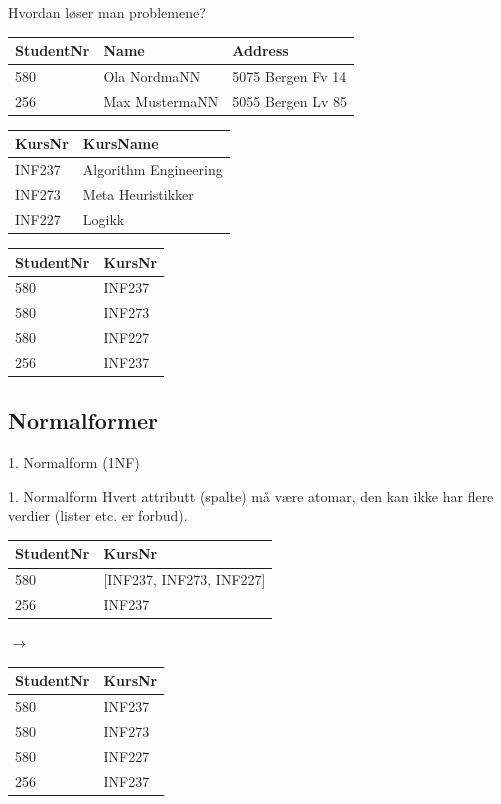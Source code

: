 \begin{frame}{Hvordan løser man problemene?}
\begin{tabular}{l|l|l}
 StudentNr & Name & Address\\\hline
 580 & Ola NordmaNN & 5075 Bergen Fv 14\\
 256 & Max MustermaNN & 5055 Bergen Lv 85\\
\end{tabular}
\vfill
\begin{tabular}{l|l}
KursNr & KursName \\\hline
INF237 & Algorithm Engineering\\
INF273 & Meta Heuristikker\\
INF227 & Logikk\\
\end{tabular}
\hfill
\begin{tabular}{l|l}
 StudentNr & KursNr\\\hline
 580 & INF237\\
 580 & INF273\\
 580 & INF227\\
 256 & INF237\\
\end{tabular}
\end{frame}

\subsection*{Normalformer}
\begin{frame}{1. Normalform (1NF)}
    \begin{block}{1. Normalform}
    Hvert attributt (spalte) må være atomar, den kan ikke har flere verdier (lister etc. er forbud).
    \end{block}
    \vfill
    \begin{tabular}{l|l}
     StudentNr & KursNr\\\hline
     580 & [INF237, INF273, INF227]\\
     256 & INF237\\
     \end{tabular}
     \hfill
     $\rightarrow$
     \hfill
     \begin{tabular}{l|l}
     StudentNr & KursNr\\\hline
     580 & INF237\\
     580 & INF273\\
     580 & INF227\\
     256 & INF237\\
    \end{tabular}
\end{frame}

